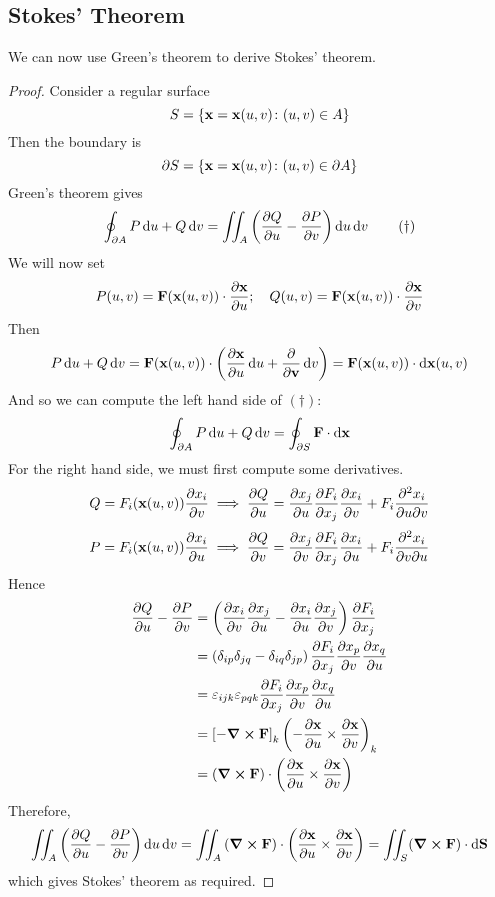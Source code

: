 \subsection{Stokes' Theorem}
We can now use Green's theorem to derive Stokes' theorem.
\begin{proof}
	Consider a regular surface
	\[
		S = \left\{ \vb x = \vb x(u, v) \colon (u, v) \in A \right\}
	\]
	Then the boundary is
	\[
		\partial S = \left\{ \vb x = \vb x(u, v) \colon (u, v) \in \partial A \right\}
	\]
	Green's theorem gives
	\begin{equation}
		\oint_{\partial A} P \dd{u} + Q \dd{v} = \iint_A \left( \pdv{Q}{u} - \pdv{P}{v} \right) \dd{u}\dd{v}
		\tag{\(\dagger\)}
	\end{equation}
	We will now set
	\[
		P(u, v) = \vb F(\vb x(u, v)) \cdot \pdv{\vb x}{u};\quad Q(u, v) = \vb F(\vb x(u, v)) \cdot \pdv{\vb x}{v}
	\]
	Then
	\[
		P \dd{u} + Q \dd{v} = \vb F(\vb x(u, v)) \cdot \left( \pdv{\vb x}{u} \dd{u} + \pdv{\vb v} \dd{v} \right) = \vb F(\vb x(u, v)) \cdot \dd{\vb x(u, v)}
	\]
	And so we can compute the left hand side of \((\dagger)\):
	\[
		\oint_{\partial A} P \dd{u} + Q \dd{v} = \oint_{\partial S} \vb F \cdot \dd{\vb x}
	\]
	For the right hand side, we must first compute some derivatives.
	\[
		Q = F_i(\vb x(u, v))\pdv{x_i}{v} \implies \pdv{Q}{u} = \pdv{x_j}{u}\pdv{F_i}{x_j}\pdv{x_i}{v} + F_i \pdv{x_i}{u}{v}
	\]
	\[
		P = F_i(\vb x(u, v))\pdv{x_i}{u} \implies \pdv{Q}{v} = \pdv{x_j}{v}\pdv{F_i}{x_j}\pdv{x_i}{u} + F_i \pdv{x_i}{v}{u}
	\]
	Hence
	\begin{align*}
		\pdv{Q}{u} - \pdv{P}{v} & = \left( \pdv{x_i}{v}\pdv{x_j}{u} - \pdv{x_i}{u}\pdv{x_j}{v} \right) \pdv{F_i}{x_j}                       \\
		                        & = \left( \delta_{ip} \delta_{jq} - \delta_{iq} \delta_{jp} \right) \pdv{F_i}{x_j}\pdv{x_p}{v}\pdv{x_q}{u} \\
		                        & = \varepsilon_{ijk} \varepsilon_{pqk} \pdv{F_i}{x_j}\pdv{x_p}{v}\pdv{x_q}{u}                              \\
		                        & = \left[ -\curl{\vb F} \right]_k \left( -\pdv{\vb x}{u} \times \pdv{\vb x}{v} \right)_k                   \\
		                        & = \left( \curl{\vb F} \right) \cdot \left( \pdv{\vb x}{u} \times \pdv{\vb x}{v} \right)                   \\
	\end{align*}
	Therefore,
	\[
		\iint_{A} \left( \pdv{Q}{u} - \pdv{P}{v} \right) \dd{u}\dd{v} = \iint_{A} \left( \curl{\vb F} \right) \cdot \left( \pdv{\vb x}{u} \times \pdv{\vb x}{v} \right) = \iint_{S} (\curl{\vb F}) \cdot \dd{\vb S}
	\]
	which gives Stokes' theorem as required.
\end{proof}
